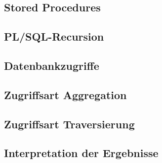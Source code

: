 \subsection{Stored Procedures}
\subsection{PL/SQL-Recursion}
\subsection{Datenbankzugriffe}
\subsection{Zugriffsart Aggregation}
\subsection{Zugriffsart Traversierung}
\subsection{Interpretation der Ergebnisse}